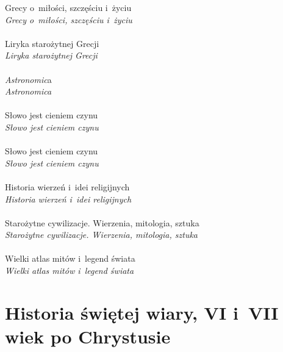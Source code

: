 \documentclass[a4paper,11pt]{article}
\begin{document}
\Jest  Grecy o~miłości, szczęściu i~życiu \\
\Powin \textit{Grecy o~miłości, szczęściu i~życiu} \\
 \\
\Jest  Liryka starożytnej Grecji \\
\Powin \textit{Liryka starożytnej Grecji} \\
 \\
\Jest  \textit{Astronomic}a \\
\Powin \textit{Astronomica} \\
 \\
\Jest  Słowo jest cieniem czynu \\
\Powin \textit{Słowo jest cieniem czynu} \\
 \\
\Jest  Słowo jest cieniem czynu \\
\Powin \textit{Słowo jest cieniem czynu} \\
 \\
\Jest  Historia wierzeń i~idei religijnych \\
\Powin \textit{Historia wierzeń i~idei religijnych} \\
 \\
\Jest  Starożytne cywilizacje. Wierzenia, mitologia, sztuka \\
\Powin \textit{Starożytne cywilizacje. Wierzenia, mitologia, sztuka} \\
 \\
\Jest  Wielki atlas mitów i~legend świata \\
\Powin \textit{Wielki atlas mitów i~legend świata} \\













\newpage

\section{Historia świętej wiary, VI i~VII wiek po Chrystusie}

\end{document}
